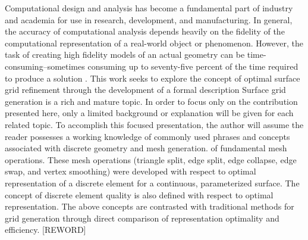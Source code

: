 Computational design and analysis has become a fundamental part of industry and
academia for use in research, development, and manufacturing. In general, the
accuracy of computational analysis depends heavily on the fidelity of the
computational representation of a real-world object or phenomenon. However, the
task of creating high fidelity models of an actual geometry can be
time-consuming--sometimes consuming up to seventy-five percent of the time
required to produce a solution \cite{bischoff05}. This work seeks to explore the
concept of optimal surface grid refinement through the development of a formal
description Surface grid generation is a rich and mature topic.  In order to
focus only on the contribution presented here, only a limited background or
explanation will be given for each related topic.  To accomplish this focused
presentation, the author will assume the reader possesses a working knowledge
of commonly used phrases and concepts associated with discrete geometry and
mesh generation.  of fundamental mesh operations. These mesh operations
(triangle split, edge split, edge collapse, edge swap, and vertex smoothing)
were developed with respect to optimal representation of a discrete element
for a continuous, parameterized surface. The concept of discrete element
quality is also defined with respect to optimal representation. The above
concepts are contrasted with traditional methods for grid generation through
direct comparison of representation optimality and efficiency.
[REWORD]
